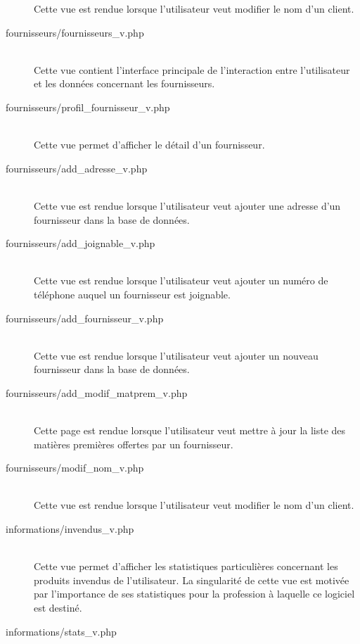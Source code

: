 \begin{description}
                Cette vue est rendue lorsque l'utilisateur veut modifier le
                nom d'un client.
            \item[fournisseurs/fournisseurs\_v.php]\hfill \\  
                Cette vue contient l'interface principale de l'interaction
                entre l'utilisateur et les données concernant les fournisseurs.
            \item[fournisseurs/profil\_fournisseur\_v.php]\hfill \\
                Cette vue permet d'afficher le détail d'un fournisseur.
            \item[fournisseurs/add\_adresse\_v.php]\hfill \\      
                Cette vue est rendue lorsque l'utilisateur veut ajouter une
                adresse d'un fournisseur dans la base de données.
            \item[fournisseurs/add\_joignable\_v.php]\hfill \\      
                Cette vue est rendue lorsque l'utilisateur veut ajouter un
                numéro de téléphone auquel un fournisseur est joignable.
            \item[fournisseurs/add\_fournisseur\_v.php]\hfill \\  
                Cette vue est rendue lorsque l'utilisateur veut ajouter un
                nouveau fournisseur dans la base de données.
            \item[fournisseurs/add\_modif\_matprem\_v.php]\hfill \\  
                Cette page est rendue lorsque l'utilisateur veut mettre à
                jour la liste des matières premières offertes par un
                fournisseur.
            \item[fournisseurs/modif\_nom\_v.php]\hfill \\
                Cette vue est rendue lorsque l'utilisateur veut modifier le
                nom d'un client.
            \item[informations/invendus\_v.php]\hfill \\
                Cette vue permet d'afficher les statistiques particulières
                concernant les produits invendus de l'utilisateur. La
                singularité de cette vue est motivée par l'importance de ses
                statistiques pour la profession à laquelle ce logiciel est
                destiné.
            \item[informations/stats\_v.php]\hfill \\

\end{description}
